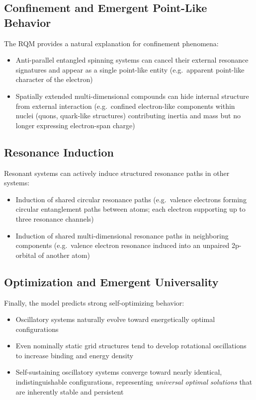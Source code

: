 \documentclass[11pt,a4paper]{article}
\begin{document}
\subsection{Confinement and Emergent Point-Like Behavior}

The RQM provides a natural explanation for confinement phenomena:

\begin{itemize}
  \item Anti-parallel entangled spinning systems can cancel their external resonance signatures and appear as a single point-like entity (e.g.\ apparent point-like character of the electron)
  \item Spatially extended multi-dimensional compounds can hide internal structure from external interaction (e.g.\ confined electron-like components within nuclei (quons, quark-like structures) contributing inertia and mass but no longer expressing electron-span charge)
\end{itemize}

\subsection{Resonance Induction}

Resonant systems can actively induce structured resonance paths in other systems:

\begin{itemize}
  \item Induction of shared circular resonance paths (e.g.\ valence electrons forming circular entanglement paths between atoms; each electron supporting up to three resonance channels)
  \item Induction of shared multi-dimensional resonance paths in neighboring components (e.g.\ valence electron resonance induced into an unpaired 2p-orbital of another atom)
\end{itemize}

\subsection{Optimization and Emergent Universality}

Finally, the model predicts strong self-optimizing behavior:

\begin{itemize}
  \item Oscillatory systems naturally evolve toward energetically optimal configurations
  \item Even nominally static grid structures tend to develop rotational oscillations to increase binding and energy density
  \item Self-sustaining oscillatory systems converge toward nearly identical, indistinguishable configurations, representing \emph{universal optimal solutions} that are inherently stable and persistent
\end{itemize}
\end{document}
